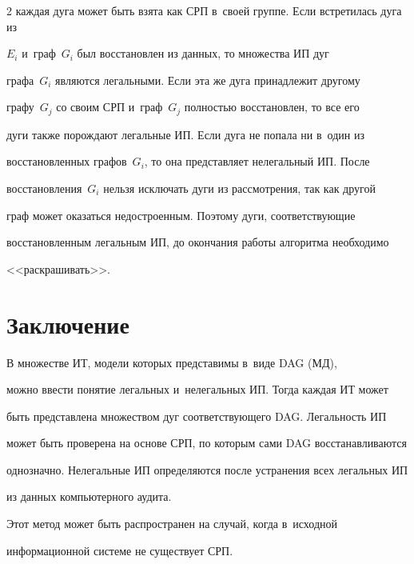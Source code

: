 \begin{multicols}{2}
каждая дуга может быть взята как СРП в~своей группе. Если встретилась дуга из 


$E_i$ и~граф~$G_i$ был восстановлен из данных, то множества ИП дуг 


графа~$G_i$ являются легальными. Если эта же дуга принадлежит другому 


графу~$G_j$ со своим СРП и~граф~$G_j$ полностью восстановлен, то все его 


дуги также порождают легальные ИП. Если дуга не попала ни в~один из 


восстановленных графов~$G_i$, то она представляет нелегальный ИП. После 


восстановления~$G_i$ нельзя исключать дуги из рассмотрения, так как другой 


граф может оказаться недостроенным. Поэтому дуги, соответствующие 


восстановленным легальным ИП, до окончания работы алгоритма необходимо 


<<раскрашивать>>.  


  


  \section{Заключение }


  


  В множестве ИТ, модели которых представимы в~виде DAG (МД), 


можно ввести понятие легальных и~нелегальных ИП. Тогда каждая ИТ может 


быть представлена множеством дуг соответствующего DAG. Легальность ИП 


может быть проверена на основе СРП, по которым сами DAG восстанавливаются 


однозначно. Нелегальные ИП определяются после устранения всех легальных ИП 


из данных компьютерного аудита. 


  


  Этот метод может быть распространен на случай, когда в~исходной 


  информационной системе не  существует СРП. 


  


{\small\frenchspacing


 {%


}}
\end{multicols}

